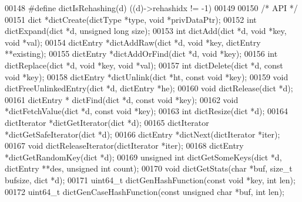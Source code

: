 \begin{DoxyCode}
00148 \textcolor{preprocessor}{#}\textcolor{preprocessor}{define} \textcolor{preprocessor}{dictIsRehashing}\textcolor{preprocessor}{(}\textcolor{preprocessor}{d}\textcolor{preprocessor}{)} \textcolor{preprocessor}{(}\textcolor{preprocessor}{(}\textcolor{preprocessor}{d}\textcolor{preprocessor}{)}\textcolor{preprocessor}{->}\textcolor{preprocessor}{rehashidx} \textcolor{preprocessor}{!=} \textcolor{preprocessor}{-}1\textcolor{preprocessor}{)}
00149 
00150 \textcolor{comment}{/* API */}
00151 dict *dictCreate(dictType *type, \textcolor{keywordtype}{void} *privDataPtr);
00152 \textcolor{keywordtype}{int} dictExpand(dict *d, \textcolor{keywordtype}{unsigned} \textcolor{keywordtype}{long} size);
00153 \textcolor{keywordtype}{int} dictAdd(dict *d, \textcolor{keywordtype}{void} *key, \textcolor{keywordtype}{void} *val);
00154 dictEntry *dictAddRaw(dict *d, \textcolor{keywordtype}{void} *key, dictEntry **existing);
00155 dictEntry *dictAddOrFind(dict *d, \textcolor{keywordtype}{void} *key);
00156 \textcolor{keywordtype}{int} dictReplace(dict *d, \textcolor{keywordtype}{void} *key, \textcolor{keywordtype}{void} *val);
00157 \textcolor{keywordtype}{int} dictDelete(dict *d, \textcolor{keyword}{const} \textcolor{keywordtype}{void} *key);
00158 dictEntry *dictUnlink(dict *ht, \textcolor{keyword}{const} \textcolor{keywordtype}{void} *key);
00159 \textcolor{keywordtype}{void} dictFreeUnlinkedEntry(dict *d, dictEntry *he);
00160 \textcolor{keywordtype}{void} dictRelease(dict *d);
00161 dictEntry * dictFind(dict *d, \textcolor{keyword}{const} \textcolor{keywordtype}{void} *key);
00162 \textcolor{keywordtype}{void} *dictFetchValue(dict *d, \textcolor{keyword}{const} \textcolor{keywordtype}{void} *key);
00163 \textcolor{keywordtype}{int} dictResize(dict *d);
00164 dictIterator *dictGetIterator(dict *d);
00165 dictIterator *dictGetSafeIterator(dict *d);
00166 dictEntry *dictNext(dictIterator *iter);
00167 \textcolor{keywordtype}{void} dictReleaseIterator(dictIterator *iter);
00168 dictEntry *dictGetRandomKey(dict *d);
00169 \textcolor{keywordtype}{unsigned} \textcolor{keywordtype}{int} dictGetSomeKeys(dict *d, dictEntry **des, \textcolor{keywordtype}{unsigned} \textcolor{keywordtype}{int} count);
00170 \textcolor{keywordtype}{void} dictGetStats(\textcolor{keywordtype}{char} *buf, size\_t bufsize, dict *d);
00171 uint64\_t dictGenHashFunction(\textcolor{keyword}{const} \textcolor{keywordtype}{void} *key, \textcolor{keywordtype}{int} len);
00172 uint64\_t dictGenCaseHashFunction(\textcolor{keyword}{const} \textcolor{keywordtype}{unsigned} \textcolor{keywordtype}{char} *buf, \textcolor{keywordtype}{int} len);

\end{DoxyCode}
